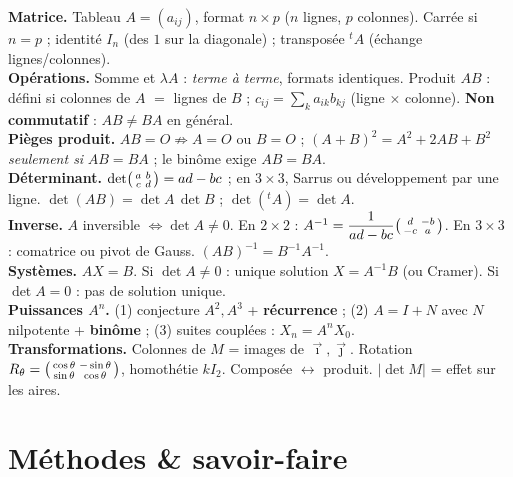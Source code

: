 \begin{synthese}
\textbf{Matrice.} Tableau $A=(a_{ij})$, format $n\times p$ ($n$ lignes, $p$ colonnes). Carrée si
$n=p$ ; identité $I_n$ (des $1$ sur la diagonale) ; transposée ${}^{t}\!A$ (échange lignes/colonnes).\\[4pt]
\textbf{Opérations.} Somme et $\lambda A$ : \emph{terme à terme}, formats identiques.
Produit $AB$ : défini si colonnes de $A$ $=$ lignes de $B$ ; $c_{ij}=\sum_k a_{ik}b_{kj}$
(ligne $\times$ colonne). \textbf{Non commutatif} : $AB\neq BA$ en général.\\[4pt]
\textbf{Pièges produit.} $AB=O\not\Rightarrow A=O$ ou $B=O$ ; $(A+B)^2=A^2+2AB+B^2$
\emph{seulement si} $AB=BA$ ; le binôme exige $AB=BA$.\\[4pt]
\textbf{Déterminant.} $\det\begin{psmallmatrix}a&b\\c&d\end{psmallmatrix}=ad-bc$ ; en $3\times3$,
Sarrus ou développement par une ligne. $\det(AB)=\det A\,\det B$ ; $\det({}^{t}\!A)=\det A$.\\[4pt]
\textbf{Inverse.} $A$ inversible $\iff\det A\neq0$. En $2\times2$ :
$A^{-1}=\dfrac1{ad-bc}\begin{psmallmatrix}d&-b\\-c&a\end{psmallmatrix}$. En $3\times3$ : comatrice
ou pivot de Gauss. $(AB)^{-1}=B^{-1}A^{-1}$.\\[4pt]
\textbf{Systèmes.} $AX=B$. Si $\det A\neq0$ : unique solution $X=A^{-1}B$ (ou Cramer). Si
$\det A=0$ : pas de solution unique.\\[4pt]
\textbf{Puissances $A^n$.} (1) conjecture $A^2,A^3$ + \textbf{récurrence} ; (2) $A=I+N$ avec $N$
nilpotente + \textbf{binôme} ; (3) suites couplées : $X_n=A^nX_0$.\\[4pt]
\textbf{Transformations.} Colonnes de $M$ = images de $\vec\imath,\vec\jmath$. Rotation
$R_\theta=\begin{psmallmatrix}\cos\theta&-\sin\theta\\\sin\theta&\cos\theta\end{psmallmatrix}$,
homothétie $kI_2$. Composée $\leftrightarrow$ produit. $|\det M|$ = effet sur les aires.
\end{synthese}

\section{Méthodes \& savoir-faire}

